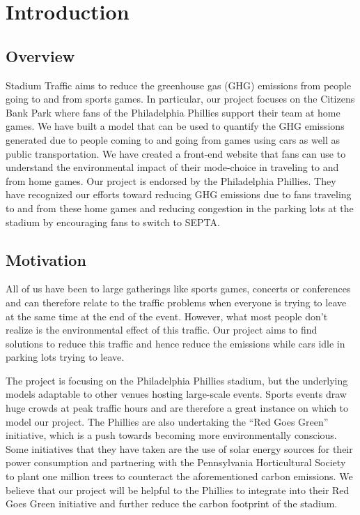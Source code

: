 \section{Introduction}
\subsection{Overview}
Stadium Traffic aims to reduce the greenhouse gas (GHG) emissions from
people going to and from sports games. In particular, our project
focuses on the Citizens Bank Park where fans of the Philadelphia
Phillies support their team at home games. We have built a model that
can be used to quantify the GHG emissions generated due to people
coming to and going from games using cars as well as public
transportation. We have created a front-end website that fans can use
to understand the environmental impact of their mode-choice in
traveling to and from home games. Our project is endorsed by the
Philadelphia Phillies. They have recognized our efforts toward
reducing GHG emissions due to fans traveling to and from these home
games and reducing congestion in the parking lots at the stadium by
encouraging fans to switch to SEPTA.

\subsection{Motivation}
All of us have been to large gatherings like sports games, concerts or
conferences and can therefore relate to the traffic problems when
everyone is trying to leave at the same time at the end of the
event. However, what most people don’t realize is the environmental
effect of this traffic. Our project aims to find solutions to reduce
this traffic and hence reduce the emissions while cars idle in parking
lots trying to leave.

The project is focusing on the Philadelphia Phillies stadium, but the
underlying models adaptable to other venues hosting large-scale
events. Sports events draw huge crowds at peak traffic hours and are
therefore a great instance on which to model our project. The Phillies
are also undertaking the “Red Goes Green” initiative, which is a push
towards becoming more environmentally conscious. Some initiatives that
they have taken are the use of solar energy sources for their power
consumption and partnering with the Pennsylvania Horticultural Society
to plant one million trees to counteract the aforementioned carbon
emissions. We believe that our project will be helpful to the Phillies
to integrate into their Red Goes Green initiative and further reduce
the carbon footprint of the stadium.

